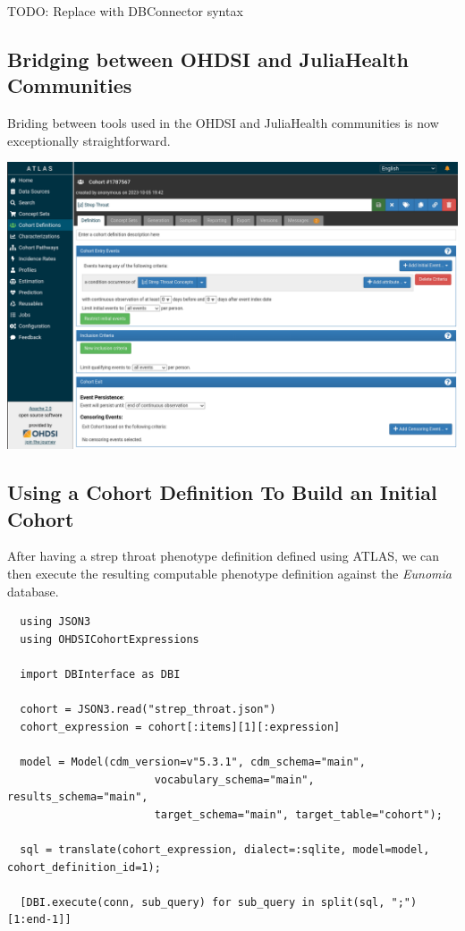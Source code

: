 \documentclass{juliacon}
\begin{document}
TODO: Replace with DBConnector syntax

\subsection{Bridging between OHDSI and JuliaHealth Communities}

Briding between tools used in the OHDSI and JuliaHealth communities is now exceptionally straightforward.

\includegraphics{./atlas_gui.png}

\subsection{Using a Cohort Definition To Build an Initial Cohort}

After having a strep throat phenotype definition defined using ATLAS, we can then execute the resulting computable phenotype definition against the \textit{Eunomia} database.

\begin{verbatim}
  using JSON3 
  using OHDSICohortExpressions

  import DBInterface as DBI

  cohort = JSON3.read("strep_throat.json")
  cohort_expression = cohort[:items][1][:expression]

  model = Model(cdm_version=v"5.3.1", cdm_schema="main",
                       vocabulary_schema="main", results_schema="main",
                       target_schema="main", target_table="cohort");

  sql = translate(cohort_expression, dialect=:sqlite, model=model, cohort_definition_id=1);

  [DBI.execute(conn, sub_query) for sub_query in split(sql, ";")[1:end-1]]
\end{verbatim}
\end{document}
